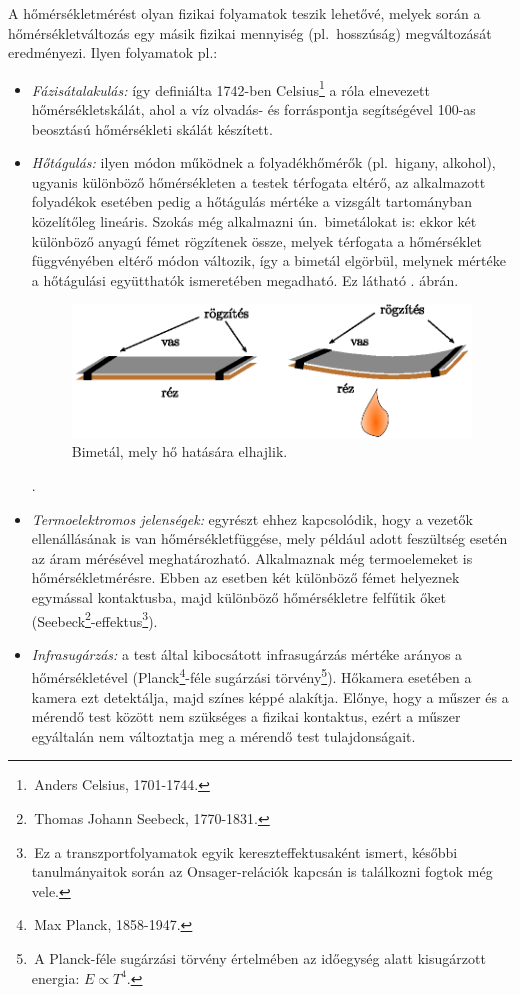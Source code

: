 A hőmérsékletmérést olyan fizikai folyamatok teszik lehetővé, melyek során a hőmérsékletváltozás egy másik fizikai mennyiség (pl.~hosszúság) megváltozását eredményezi. Ilyen folyamatok pl.:
\begin{itemize}
    \item \emph{Fázisátalakulás:} így definiálta 1742-ben Celsius\footnote{\,Anders Celsius, 1701-1744.} a róla elnevezett hőmérsékletskálát, ahol a víz olvadás- és forráspontja segítségével 100-as beosztású hőmérsékleti skálát készített.
    \item \emph{Hőtágulás:} ilyen módon működnek a folyadékhőmérők (pl.~higany, alkohol), ugyanis különböző hőmérsékleten a testek térfogata eltérő, az alkalmazott folyadékok esetében pedig a hőtágulás mértéke a vizsgált tartományban közelítőleg lineáris. Szokás még alkalmazni ún.~bimetálokat is: ekkor két különböző anyagú fémet rögzítenek össze, melyek térfogata a hőmérséklet függvényében eltérő módon változik, így a bimetál elgörbül, melynek mértéke a hőtágulási együtthatók ismeretében megadható. Ez látható . ábrán.
    \begin{figure}
        \centering
        \includegraphics{termo_1/termo_1_6.eps}
        \caption{Bimetál, mely hő hatására elhajlik.}
        \label{fig:termo_1_6}
    \end{figure}.
    \item \emph{Termoelektromos jelenségek:} egyrészt ehhez kapcsolódik, hogy a vezetők ellenállásának is van hőmérsékletfüggése, mely például adott feszültség esetén az áram mérésével meghatározható. Alkalmaznak még termoelemeket is hőmérsékletmérésre. Ebben az esetben két különböző fémet helyeznek egymással kontaktusba, majd különböző hőmérsékletre felfűtik őket (Seebeck\footnote{\,Thomas Johann Seebeck, 1770-1831.}-effektus\footnote{\,Ez a transzportfolyamatok egyik kereszteffektusaként ismert, későbbi tanulmányaitok során az Onsager-relációk kapcsán is találkozni fogtok még vele.}).
    \item \emph{Infrasugárzás:} a test által kibocsátott infrasugárzás mértéke arányos a hőmérsékletével (Planck\footnote{\,Max Planck, 1858-1947.}-féle sugárzási törvény\footnote{\,A Planck-féle sugárzási törvény értelmében az időegység alatt kisugárzott energia: $E\propto T^4$.}). Hőkamera esetében a kamera ezt detektálja, majd színes képpé alakítja. Előnye, hogy a műszer és a mérendő test között nem szükséges a fizikai kontaktus, ezért a műszer egyáltalán nem változtatja meg a mérendő test tulajdonságait.
\end{itemize}
